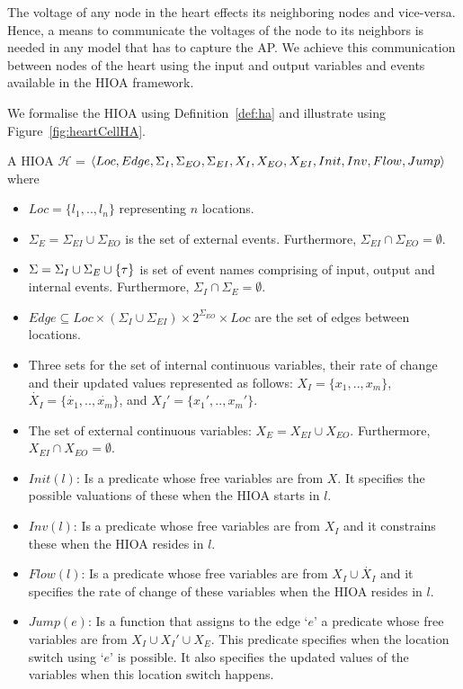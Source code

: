 The voltage of any node in the heart effects its neighboring nodes and
vice-versa. Hence, a means to communicate the voltages of the node to
its neighbors is needed in any model that has to capture the \ac{AP}. We
achieve this communication between nodes of the heart using the input
and output variables and events available in the \ac{HIOA} framework.

We formalise the \ac{HIOA} using Definition~\ref{def:ha} and illustrate
using Figure~\ref{fig:heartCellHA}.\newline


\begin{definition}
  A \acf{HIOA} \newline $\mathcal{H}$ =
  $\langle Loc, Edge, \Sigma_I, \Sigma_{EO}, \Sigma_{EI}, X_I, X_{EO},
  X_{EI}, \linebreak Init, Inv, Flow, Jump\rangle$ where
  \begin{itemize}
  \item $Loc=\{l_1,..,l_n\}$ representing $n$ locations.
  \item $\Sigma_{E} = \Sigma_{EI} \cup \Sigma_{EO}$ is the set of
    external events. Furthermore,
    \mbox{$\Sigma_{EI} \cap \Sigma_{EO} = \emptyset$}.
  \item $\Sigma=\Sigma_I \cup \Sigma_{E} \cup \{\tau\}$ is set of
    event names comprising of input, output and internal
    events. Furthermore, \mbox{$\Sigma_I \cap \Sigma_E = \emptyset$}.
  \item
    $Edge \subseteq Loc \times (\Sigma_I \cup \Sigma_{EI}) \times
    2^{\Sigma_{EO}} \times Loc$ are the set of edges between locations.
  \item Three sets for the set of internal continuous variables, their
    rate of change and their updated values represented as follows:
    $X_I=\{x_1,.., x_m\}$, $\dot{X_I}=\{\dot{x_1},.., \dot{x_m}\}$, and
    $X_I'=\{x_{1}',.., x_{m}'\}$.
  \item The set of external continuous variables:
    \mbox{$X_E = X_{EI} \cup X_{EO}$}. Furthermore,
    \mbox{$X_{EI} \cap X_{EO} = \emptyset$}.
  \item $Init(l)$: Is a predicate whose free variables are from $X$. It
    specifies the possible valuations of these when the HIOA starts in
    $l$.
  \item $Inv(l)$: Is a predicate whose free variables are from $X_I$ and
    it constrains these when the HIOA resides in $l$.
  \item $Flow(l)$: Is a predicate whose free variables are from
    $X_I \cup \dot{X_I}$ and it specifies the rate of change of these
    variables when the HIOA resides in $l$.
  \item $Jump(e)$: Is a function that assigns to the edge `$e$' a
    predicate whose free variables are from $X_I \cup X_I' \cup X_E$.
    This predicate specifies when the location switch using `$e$' is
    possible. It also specifies the updated values of the variables when
    this location switch happens.
  \end{itemize}
  \label{def:ha}
\end{definition}

